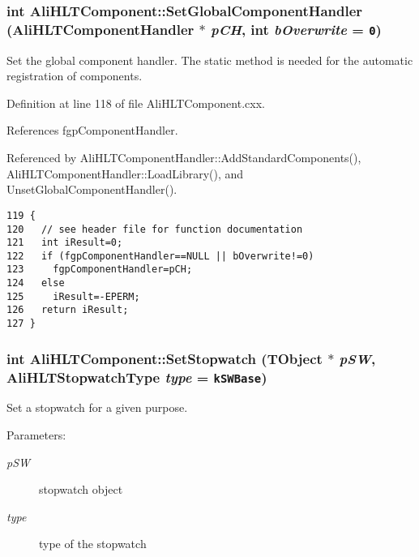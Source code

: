 \subsubsection{\setlength{\rightskip}{0pt plus 5cm}int Ali\-HLTComponent::Set\-Global\-Component\-Handler ({\bf Ali\-HLTComponent\-Handler} $\ast$ {\em p\-CH}, int {\em b\-Overwrite} = {\tt 0})\hspace{0.3cm}{\tt  [static]}}\label{classAliHLTComponent_e0}


Set the global component handler. The static method is needed for the automatic registration of components. 

Definition at line 118 of file Ali\-HLTComponent.cxx.

References fgp\-Component\-Handler.

Referenced by Ali\-HLTComponent\-Handler::Add\-Standard\-Components(), Ali\-HLTComponent\-Handler::Load\-Library(), and Unset\-Global\-Component\-Handler().

\footnotesize\begin{verbatim}119 {
120   // see header file for function documentation
121   int iResult=0;
122   if (fgpComponentHandler==NULL || bOverwrite!=0)
123     fgpComponentHandler=pCH;
124   else
125     iResult=-EPERM;
126   return iResult;
127 }
\end{verbatim}\normalsize 


\subsubsection{\setlength{\rightskip}{0pt plus 5cm}int Ali\-HLTComponent::Set\-Stopwatch (TObject $\ast$ {\em p\-SW}, {\bf Ali\-HLTStopwatch\-Type} {\em type} = {\tt kSWBase})}\label{classAliHLTComponent_a17}


Set a stopwatch for a given purpose. \begin{Desc}
\item[Parameters:]
\begin{description}
\item[{\em p\-SW}]stopwatch object \item[{\em type}]type of the stopwatch \end{description}
\end{Desc}



